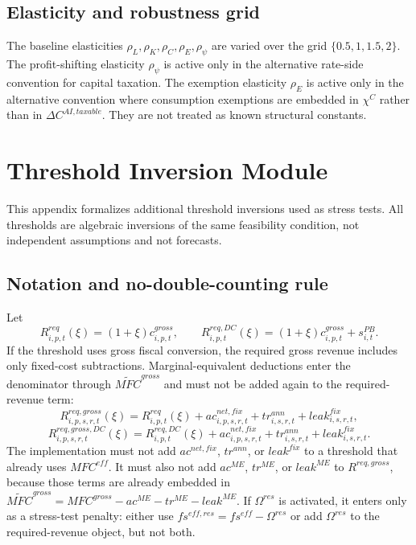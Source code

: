 \documentclass[11pt,a4paper]{article}
\begin{document}
\subsection{Elasticity and robustness grid}

The baseline elasticities $\rho_L,\rho_K,\rho_C,\rho_E,\rho_\psi$ are varied over the grid $\{0.5,1,1.5,2\}$. The profit-shifting elasticity $\rho_\psi$ is active only in the alternative rate-side convention for capital taxation. The exemption elasticity $\rho_E$ is active only in the alternative convention where consumption exemptions are embedded in $\chi^C$ rather than in $\Delta C^{AI,taxable}$. They are not treated as known structural constants.


\section{Threshold Inversion Module}\label{app:threshold_module}

This appendix formalizes additional threshold inversions used as stress tests. All thresholds are algebraic inversions of the same feasibility condition, not independent assumptions and not forecasts.

\subsection{Notation and no-double-counting rule}

Let
\begin{equation}
    R^{req}_{i,p,t}(\xi)=(1+\xi)c^{gross}_{i,p,t},
    \qquad
    R^{req,DC}_{i,p,t}(\xi)=(1+\xi)c^{gross}_{i,p,t}+s^{PB}_{i,t}.
\end{equation}
If the threshold uses gross fiscal conversion, the required gross revenue includes only fixed-cost subtractions. Marginal-equivalent deductions enter the denominator through $\widetilde{MFC}^{gross}$ and must not be added again to the required-revenue term:
\begin{equation}
    R^{req,gross}_{i,p,s,r,t}(\xi)=R^{req}_{i,p,t}(\xi)+ac^{net,fix}_{i,p,s,r,t}+tr^{ann}_{i,s,r,t}+leak^{fix}_{i,s,r,t},
\end{equation}
\begin{equation}
    R^{req,gross,DC}_{i,p,s,r,t}(\xi)=R^{req,DC}_{i,p,t}(\xi)+ac^{net,fix}_{i,p,s,r,t}+tr^{ann}_{i,s,r,t}+leak^{fix}_{i,s,r,t}.
\end{equation}
The implementation must not add $ac^{net,fix}$, $tr^{ann}$, or $leak^{fix}$ to a threshold that already uses $MFC^{eff}$. It must also not add $ac^{ME}$, $tr^{ME}$, or $leak^{ME}$ to $R^{req,gross}$, because those terms are already embedded in $\widetilde{MFC}^{gross}=MFC^{gross}-ac^{ME}-tr^{ME}-leak^{ME}$. If $\Omega^{res}$ is activated, it enters only as a stress-test penalty: either use $fs^{eff,res}=fs^{eff}-\Omega^{res}$ or add $\Omega^{res}$ to the required-revenue object, but not both.
\end{document}
